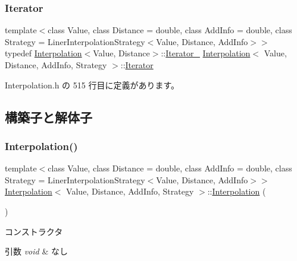 \subsubsection{\texorpdfstring{Iterator}{Iterator}}
{\footnotesize\ttfamily template$<$class Value, class Distance = double, class Add\+Info = double, class Strategy = Liner\+Interpolation\+Strategy$<$\+Value, Distance, Add\+Info$>$$>$ \\
typedef \mbox{\hyperlink{class_interpolation}{Interpolation}}$<$Value, Distance$>$\+::\mbox{\hyperlink{class_interpolation_1_1_iterator__}{Iterator\+\_\+}} \mbox{\hyperlink{class_interpolation}{Interpolation}}$<$ Value, Distance, Add\+Info, Strategy $>$\+::\mbox{\hyperlink{class_interpolation_a066eb9906faf7f1d56ba68d00c6be64a}{Iterator}}}



 Interpolation.\+h の 515 行目に定義があります。



\subsection{構築子と解体子}
\mbox{\label{class_interpolation_a023b5a27fc450db2b2f19c881243cab6}} 
\subsubsection{\texorpdfstring{Interpolation()}{Interpolation()}}
{\footnotesize\ttfamily template$<$class Value, class Distance = double, class Add\+Info = double, class Strategy = Liner\+Interpolation\+Strategy$<$\+Value, Distance, Add\+Info$>$$>$ \\
\mbox{\hyperlink{class_interpolation}{Interpolation}}$<$ Value, Distance, Add\+Info, Strategy $>$\+::\mbox{\hyperlink{class_interpolation}{Interpolation}} (\begin{DoxyParamCaption}{ }\end{DoxyParamCaption})\hspace{0.3cm}{\ttfamily [inline]}}



コンストラクタ 


\begin{DoxyParams}{引数}
{\em void} & なし \\
\hline
\end{DoxyParams}


